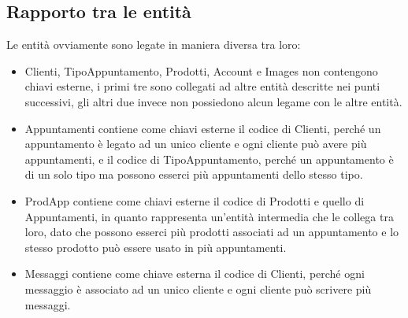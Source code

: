 {	\subsection{Rapporto tra le entità} {
		Le entità ovviamente sono legate in maniera diversa tra loro:
		\begin{itemize}
			\item Clienti, TipoAppuntamento, Prodotti, Account e Images non contengono chiavi esterne, i primi tre sono collegati ad altre entità descritte nei punti successivi, gli altri due invece non possiedono alcun legame con le altre entità.
			\item Appuntamenti contiene come chiavi esterne il codice di Clienti, perché un appuntamento è legato ad un unico cliente e ogni cliente può avere più appuntamenti, e il codice di TipoAppuntamento, perché un appuntamento è di un solo tipo ma possono esserci più appuntamenti dello stesso tipo.
			\item ProdApp contiene come chiavi esterne il codice di Prodotti e quello di Appuntamenti, in quanto rappresenta un'entità intermedia che le collega tra loro, dato che possono esserci più prodotti associati ad un appuntamento e lo stesso prodotto può essere usato in più appuntamenti.
			\item Messaggi contiene come chiave esterna il codice di Clienti, perché ogni messaggio è associato ad un unico cliente e ogni cliente può scrivere più messaggi.
		\end{itemize}
	}
}
